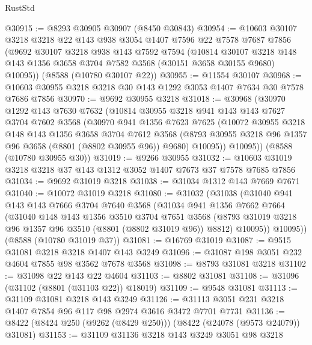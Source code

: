 \begin{lexlean}{RustStd}
\begin{coremodule}
@30915 := @8293 @30905 @30907 (@8450 @30843)
@30954 := @10603
    @30107
    @3218
    @3218
    @22
    @143
    @938
    @3054
    @1407
    @7596
    @22
    @7578
    @7687
    @7856
    (@9692
      @30107
      @3218
      @938
      @143
      @7592
      @7594
      (@10814
        @30107
        @3218
        @148
        @143
        @1356
        @3658
        @3704
        @7582
        @3568
        (@30151 @3658 @30155 @9680)
        @10095))
    (@8588 (@10780 @30107 @22))
@30955 := @11554 @30107
@30968 := @10603 @30955 @3218 @3218 @30 @143 @1292 @3053 @1407 @7634 @30 @7578 @7686 @7856
@30970 := @9692 @30955 @3218
@31018 := @30968
    (@30970
      @1292
      @143
      @7630
      @7632
      (@10814
        @30955
        @3218
        @941
        @143
        @143
        @7627
        @3704
        @7602
        @3568
        (@30970
          @941
          @1356
          @7623
          @7625
          (@10072
            @30955
            @3218
            @148
            @143
            @1356
            @3658
            @3704
            @7612
            @3568
            (@8793 @30955 @3218 @96 @1357 @96 @3658 (@8801 (@8802 @30955 @96)) @9680)
            @10095))
        @10095))
    (@8588 (@10780 @30955 @30))
@31019 := @9266 @30955
@31032 := @10603 @31019 @3218 @3218 @37 @143 @1312 @3052 @1407 @7673 @37 @7578 @7685 @7856
@31034 := @9692 @31019 @3218
@31038 := @31034 @1312 @143 @7669 @7671
@31040 := @10072 @31019 @3218
@31080 := @31032
    (@31038
      (@31040
        @941
        @143
        @143
        @7666
        @3704
        @7640
        @3568
        (@31034
          @941
          @1356
          @7662
          @7664
          (@31040
            @148
            @143
            @1356
            @3510
            @3704
            @7651
            @3568
            (@8793 @31019 @3218 @96 @1357 @96 @3510 (@8801 (@8802 @31019 @96)) @8812)
            @10095))
        @10095))
    (@8588 (@10780 @31019 @37))
@31081 := @16769 @31019
@31087 := @9515 @31081 @3218 @3218 @1407 @143 @3249
@31096 := @31087 @198 @3051 @232 @4604 @7855 @98 @3562 @7678 @3568
@31098 := @8793 @31081 @3218
@31102 := @31098 @22 @143 @22 @4604
@31103 := @8802 @31081
@31108 := @31096 (@31102 (@8801 (@31103 @22)) @18019)
@31109 := @9548 @31081
@31113 := @31109 @31081 @3218 @143 @3249
@31126 := @31113 @3051 @231 @3218 @1407 @7854 @96 @117 @98 @2974 @3616 @3472 @7701 @7731
@31136 := @8422 (@8424 @250 (@9262 (@8429 @250))) (@8422 (@24078 (@9573 @24079)) @31081)
@31153 := @31109
    @31136
    @3218
    @143
    @3249
    @3051
    @98
    @3218

\end{coremodule}
\end{lexlean}
